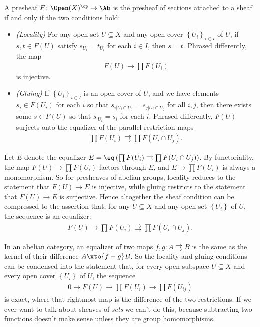\documentclass[11pt]{book}
\begin{document}
\begin{theorem} A presheaf $F \colon \Open(X)^\op \to \Ab$ is the presheaf of sections attached to a sheaf if and only if the two conditions hold:
\begin{itemize}
    \item[\textbf{Sh1}] \textit{(Locality)} For any open set $U \subseteq X$ and any open cover $\left\{ U_i \right\}_{i\in I}$ of $U$, if $s,t\in F(U)$ satisfy $s_{U_i} = t_{U_i}$ for each $i \in I$, then $s=t$. Phrased differently, the map
    \begin{align*}
        F(U) \to \prod F(U_i)
    \end{align*}
    is injective.

    \item[\textbf{Sh2}] \textit{(Gluing)} If $\left\{ U_i \right\}_{i\in I}$ is an open cover of $U$, and we have elements $s_i \in F(U_i)$ for each $i$ so that $s_{i|U_i\cap U_j} = s_{j|U_i\cap U_j}$ for all $i,j$, then there exists some $s\in F(U)$ so that $s_{|U_i} = s_i$ for each $i$. Phrased differently, $F(U)$ surjects onto the equalizer of the parallel restriction maps
    \begin{align*}
        \prod F(U_i) \rightrightarrows \prod F(U_i\cap U_j).
    \end{align*}
\end{itemize}
\end{theorem}

\begin{remark} Let $E$ denote the equalizer $E = \eq \left( \prod F(U_i) \rightrightarrows \prod F(U_i\cap U_j) \right)$. By functoriality, the map $F(U) \to \prod F(U_i)$ factors through $E$, and $E \to \prod F(U_i)$ is always a monomorphism. So for presheaves of abelian groups, locality reduces to the statement that $F(U) \to E$ is injective, while gluing restricts to the statement that $F(U) \to E$ is surjective. Hence altogether the sheaf condition can be compressed to the assertion that, for any $U \subseteq X$ and any open set $\left\{ U_i \right\}$ of $U$, the sequence is an equalizer:
\begin{align*}
    F(U) \to \prod F(U_i) \rightrightarrows \prod F(U_i\cap U_j).
\end{align*}
\end{remark}


\begin{remark} In an abelian category, an equalizer of two maps $f,g \colon A \rightrightarrows B$ is the same as the kernel of their difference $A \xto{f-g} B$. So the locality and gluing conditions can be condensed into the statement that, for every open subspace $U \subseteq X$ and every open cover $\left\{ U_i \right\}$ of $U$, the sequence
\begin{align*}
    0 \to F(U) \to \prod F(U_i) \to \prod F(U_{ij})
\end{align*}
is exact, where that rightmost map is the difference of the two restrictions. If we ever want to talk about sheaves of \emph{sets} we can't do this, because subtracting two functions doesn't make sense unless they are group homomorphisms.
\end{remark}
\end{document}
